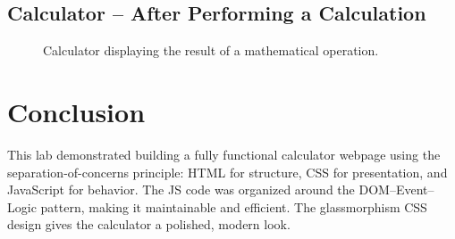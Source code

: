 \documentclass[12pt,a4paper]{article}
\begin{document}
\subsection{Calculator -- After Performing a Calculation}
\begin{figure}[h!]
  \centering
  \caption{Calculator displaying the result of a mathematical operation.}
\end{figure}

\section{Conclusion}
This lab demonstrated building a fully functional calculator webpage using the separation-of-concerns principle: HTML for structure, CSS for presentation, and JavaScript for behavior. The JS code was organized around the DOM--Event--Logic pattern, making it maintainable and efficient. The glassmorphism CSS design gives the calculator a polished, modern look.
\end{document}
